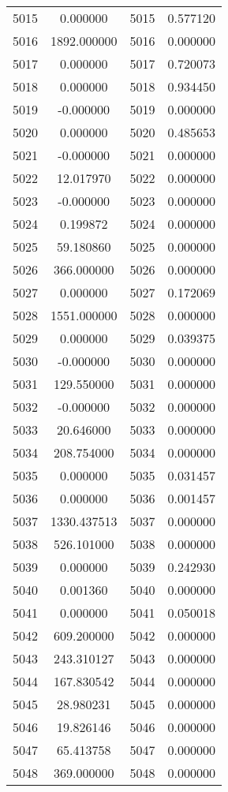 \documentclass[12pt]{article}
\begin{document}
\begin{longtable}{@{}cccc@{}}
5015 & 0.000000 & 5015 & 0.577120 \\
5016 & 1892.000000 & 5016 & 0.000000 \\
5017 & 0.000000 & 5017 & 0.720073 \\
5018 & 0.000000 & 5018 & 0.934450 \\
5019 & -0.000000 & 5019 & 0.000000 \\
5020 & 0.000000 & 5020 & 0.485653 \\
5021 & -0.000000 & 5021 & 0.000000 \\
5022 & 12.017970 & 5022 & 0.000000 \\
5023 & -0.000000 & 5023 & 0.000000 \\
5024 & 0.199872 & 5024 & 0.000000 \\
5025 & 59.180860 & 5025 & 0.000000 \\
5026 & 366.000000 & 5026 & 0.000000 \\
5027 & 0.000000 & 5027 & 0.172069 \\
5028 & 1551.000000 & 5028 & 0.000000 \\
5029 & 0.000000 & 5029 & 0.039375 \\
5030 & -0.000000 & 5030 & 0.000000 \\
5031 & 129.550000 & 5031 & 0.000000 \\
5032 & -0.000000 & 5032 & 0.000000 \\
5033 & 20.646000 & 5033 & 0.000000 \\
5034 & 208.754000 & 5034 & 0.000000 \\
5035 & 0.000000 & 5035 & 0.031457 \\
5036 & 0.000000 & 5036 & 0.001457 \\
5037 & 1330.437513 & 5037 & 0.000000 \\
5038 & 526.101000 & 5038 & 0.000000 \\
5039 & 0.000000 & 5039 & 0.242930 \\
5040 & 0.001360 & 5040 & 0.000000 \\
5041 & 0.000000 & 5041 & 0.050018 \\
5042 & 609.200000 & 5042 & 0.000000 \\
5043 & 243.310127 & 5043 & 0.000000 \\
5044 & 167.830542 & 5044 & 0.000000 \\
5045 & 28.980231 & 5045 & 0.000000 \\
5046 & 19.826146 & 5046 & 0.000000 \\
5047 & 65.413758 & 5047 & 0.000000 \\
5048 & 369.000000 & 5048 & 0.000000 \\

\end{longtable}
\end{document}
